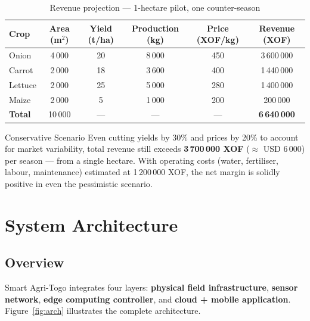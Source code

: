\documentclass[12pt, a4paper]{report}
\begin{document}
\begin{table}[H]
\centering
\caption{Revenue projection — 1-hectare pilot, one counter-season}
\label{tab:revenue}
\renewcommand{\arraystretch}{1.4}
\begin{tabular}{lccccc}
\toprule
\textbf{Crop} & \textbf{Area (m$^2$)} & \textbf{Yield (t/ha)} &
\textbf{Production (kg)} & \textbf{Price (XOF/kg)} & \textbf{Revenue (XOF)} \\
\midrule
Onion   & 4\,000 & 20 & 8\,000  & 450 & 3\,600\,000 \\
Carrot  & 2\,000 & 18 & 3\,600  & 400 & 1\,440\,000 \\
Lettuce & 2\,000 & 25 & 5\,000  & 280 & 1\,400\,000 \\
Maize   & 2\,000 &  5 & 1\,000  & 200 &   200\,000 \\
\midrule
\textbf{Total} & 10\,000 & — & — & — & \textbf{6\,640\,000} \\
\bottomrule
\end{tabular}
\end{table}

\begin{warnbox}{Conservative Scenario}
Even cutting yields by 30\% and prices by 20\% to account for market variability, total revenue still exceeds \textbf{3\,700\,000 XOF} ($\approx$ USD 6\,000) per season — from a single hectare. With operating costs (water, fertiliser, labour, maintenance) estimated at 1\,200\,000 XOF, the net margin is solidly positive in even the pessimistic scenario.
\end{warnbox}

\chapter{System Architecture}

\section{Overview}

Smart Agri-Togo integrates four layers: \textbf{physical field infrastructure}, \textbf{sensor network}, \textbf{edge computing controller}, and \textbf{cloud + mobile application}. Figure~\ref{fig:arch} illustrates the complete architecture.
\end{document}
